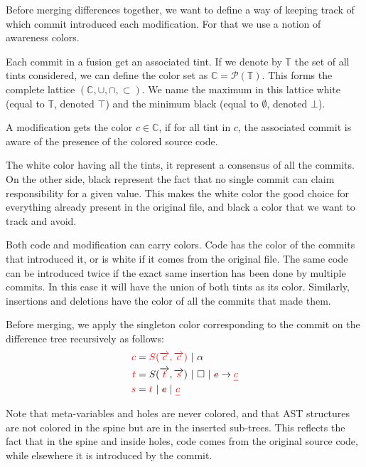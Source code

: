 \documentclass[a4paper,11pt]{article}
\newcommand\typsep{\ |\ }
\newcommand\mathst[1]{\text{\st{$#1$}}}
\newcommand\mathul[1]{\text{\ul{$#1$}}}
\newcommand\id{\square}
\newcommand\change[2]{\mathst{#1} \rightarrow \mathul{#2}}
\begin{document}
Before merging differences together, we want to define a way of keeping track of which commit introduced each modification. For that we use a notion of awareness colors.

Each commit in a fusion get an associated tint. If we denote by $\mathbb{T}$ the set of all tints considered, we can define the color set as $\mathbb{C} = \mathcal{P}(\mathbb{T})$. This forms the complete lattice $(\mathbb{C}, \cup, \cap, \subset)$. We name the maximum in this lattice white (equal to $\mathbb{T}$, denoted $\top$) and the minimum black (equal to $\emptyset$, denoted $\bot$).

A modification gets the color $c \in \mathbb{C}$, if for all tint in $c$, the associated commit is aware of the presence of the colored source code.

The white color having all the tints, it represent a consensus of all the commits. On the other side, black represent the fact that no single commit can claim responsibility for a given value. This makes the white color the good choice for everything already present in the original file, and black a color that we want to track and avoid.

Both code and modification can carry colors. Code has the color of the commits that introduced it, or is white if it comes from the original file. The same code can be introduced twice if the exact same insertion has been done by multiple commits. In this case it will have the union of both tints as its color. Similarly, insertions and deletions have the color of all the commits that made them.

Before merging, we apply the singleton color corresponding to the commit on the difference tree recursively as follows:
\begin{align*}
{\color{red}c} &= {\color{red}S(\overrightarrow{c}, \overrightarrow{c})} \typsep \alpha\\
{\color{red}t} &= S(\overrightarrow{\color{red}t}, \overrightarrow{\color{red}s}) \typsep \id \typsep {\setstcolor{red}\setulcolor{red}\change{c}{\color{red}c}}\\
{\color{red}s} &= {\color{red}t} \typsep {\setstcolor{red}\mathst{c}} \typsep {\color{red}\mathul{c}}\\
\end{align*}

Note that meta-variables and holes are never colored, and that AST structures are not colored in the spine but are in the inserted sub-trees. This reflects the fact that in the spine and inside holes, code comes from the original source code, while elsewhere it is introduced by the commit.
\end{document}
